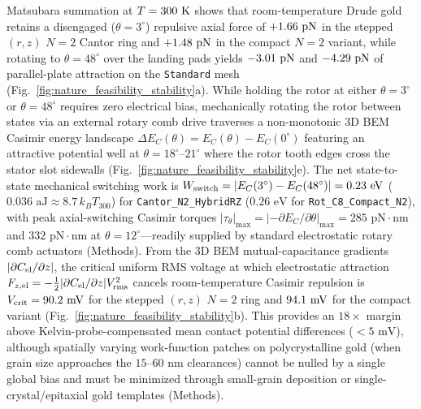 \documentclass[pdflatex,sn-nature]{sn-jnl}
\DeclareRobustCommand{\roundone}[1]{\fpeval{round(#1,1)}}
\DeclareRobustCommand{\roundtwo}[1]{\fpeval{round(#1,2)}}
\begin{document}
Matsubara summation at $T = 300{}\text{ K}$ shows that room-temperature Drude gold retains a disengaged ($\theta=3^\circ$) repulsive axial force of $+\roundtwo{\NatureCantorNtwoHybridrzPatchPotentialFCasimirGoldThreezerozerokPn}\text{ pN}$ in the stepped $(r,z)$ $N=2$ Cantor ring and $+\roundtwo{\NatureRotCeightCompactNtwoPatchPotentialFCasimirGoldThreezerozerokPn}\text{ pN}$ in the compact $N=2$ variant, while rotating to $\theta=48^\circ$ over the landing pads yields $\roundtwo{\NatureCantorNtwoHybridrzStepfiveForceZPn}\text{ pN}$ and $\roundtwo{\NatureRotCeightCompactNtwoSteptwooneForceZPn}\text{ pN}$ of parallel-plate attraction on the \texttt{Standard} mesh (Fig.~\ref{fig:nature_feasibility_stability}a). While holding the rotor at either $\theta = 3^\circ$ or $\theta = 48^\circ$ requires zero electrical bias, mechanically rotating the rotor between states via an external rotary comb drive traverses a non-monotonic 3D BEM Casimir energy landscape $\Delta E_C(\theta) = E_C(\theta) - E_C(0^\circ)$ featuring an attractive potential well at $\theta = 18^\circ\text{--}21^\circ$ where the rotor tooth edges cross the stator slot sidewalls (Fig.~\ref{fig:nature_feasibility_stability}e). The net state-to-state mechanical switching work is $W_{\rm switch} = |E_C(3^\circ) - E_C(48^\circ)| = 0.23\text{ eV}$ ($0.036\text{ aJ} \approx 8.7\,k_B T_{300}$) for \texttt{Cantor\_N2\_HybridRZ} ($0.26\text{ eV}$ for \texttt{Rot\_C8\_Compact\_N2}), with peak axial-switching Casimir torques $|\tau_\theta|_{\max} = |-\partial E_C/\partial\theta|_{\max} = 285\text{ pN}\cdot\text{nm}$ and $332\text{ pN}\cdot\text{nm}$ at $\theta = 12^\circ$---readily supplied by standard electrostatic rotary comb actuators (Methods). From the 3D BEM mutual-capacitance gradients $|\partial C_{\rm el}/\partial z|$, the critical uniform RMS voltage at which electrostatic attraction $F_{z,\rm el} = -\frac{1}{2}|\partial C_{\rm el}/\partial z|V_{\rm rms}^2$ cancels room-temperature Casimir repulsion is $V_{\rm crit} = \roundone{\NatureCantorNtwoHybridrzPatchPotentialVCritMv}\text{ mV}$ for the stepped $(r,z)$ $N=2$ ring and $\roundone{\NatureRotCeightCompactNtwoPatchPotentialVCritMv}\text{ mV}$ for the compact variant (Fig.~\ref{fig:nature_feasibility_stability}b). This provides an $18\times$ margin above Kelvin-probe-compensated mean contact potential differences ($<5\text{ mV}$), although spatially varying work-function patches on polycrystalline gold (when grain size approaches the $15\text{--}60\text{ nm}$ clearances) cannot be nulled by a single global bias and must be minimized through small-grain deposition or single-crystal/epitaxial gold templates (Methods).
\end{document}
